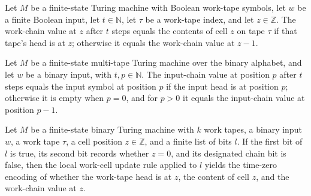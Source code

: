 \begin{theorem}
\label{Complexity.workChain_eq}
\leanok
{}
Let $M$ be a finite-state Turing machine with Boolean work-tape symbols, let $w$ be a
finite Boolean input, let $t\in\mathbb{N}$, let $\tau$ be a work-tape index, and let
$z\in\mathbb{Z}$. The work-chain value at $z$ after $t$ steps equals the contents of
cell $z$ on tape $\tau$ if that tape's head is at $z$; otherwise it equals the
work-chain value at $z-1$.
\end{theorem}

\begin{theorem}
\label{Complexity.inpChain_eq}
\leanok
{}
Let $M$ be a finite-state multi-tape Turing machine over the binary alphabet, and let
$w$ be a binary input, with $t,p\in\mathbb N$. The input-chain value at position $p$
after $t$ steps equals the input symbol at position $p$ if the input head is at position
$p$; otherwise it is empty when $p=0$, and for $p>0$ it equals the input-chain value at
position $p-1$.
\end{theorem}

\begin{theorem}
\label{Complexity.cfgF_cell_zero}
\leanok
{}
Let $M$ be a finite-state binary Turing machine with $k$ work tapes, a binary input $w$,
a work tape $\tau$, a cell position $z\in\mathbb Z$, and a finite list of bits $l$. If
the first bit of $l$ is true, its second bit records whether $z=0$, and its designated
chain bit is false, then the local work-cell update rule applied to $l$ yields the
time-zero encoding of whether the work-tape head is at $z$, the content of cell $z$, and
the work-chain value at $z$.
\end{theorem}

